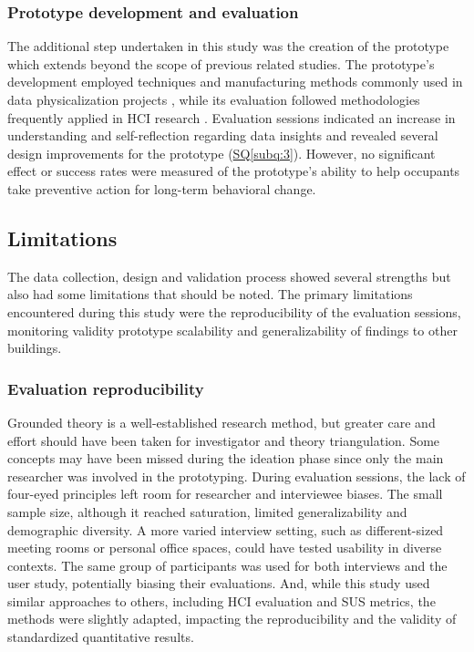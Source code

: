 \subsubsection{Prototype development and evaluation}
The additional step undertaken in this study was the creation of the prototype which extends beyond the scope of previous related studies. The prototype's development employed techniques and manufacturing methods commonly used in data physicalization projects \cite{alexander_data_2019, jansen_opportunities_2015}, while its evaluation followed methodologies frequently applied in HCI research \cite{ranasinghe_encoding_2023, sauve_physecology_2022}. Evaluation sessions indicated an increase in understanding and self-reflection regarding data insights and revealed several design improvements for the prototype (\hyperref[subq:2]{SQ\ref*{subq:3}}). However, no significant effect or success rates were measured of the prototype's ability to help occupants take preventive action for long-term behavioral change.

\subsection{Limitations}

The data collection, design and validation process showed several strengths but also had some limitations that should be noted. The primary limitations encountered during this study were the reproducibility of the evaluation sessions, monitoring validity prototype scalability and generalizability of findings to other buildings.

\subsubsection{Evaluation reproducibility}

Grounded theory is a well-established research method, but greater care and effort should have been taken for investigator and theory triangulation. Some concepts may have been missed during the ideation phase since only the main researcher was involved in the prototyping. During evaluation sessions, the lack of four-eyed principles left room for researcher and interviewee biases. The small sample size, although it reached saturation, limited generalizability and demographic diversity. A more varied interview setting, such as different-sized meeting rooms or personal office spaces, could have tested usability in diverse contexts. The same group of participants was used for both interviews and the user study, potentially biasing their evaluations. And, while this study used similar approaches to others, including HCI evaluation and SUS metrics, the methods were slightly adapted, impacting the reproducibility and the validity of standardized quantitative results. 


